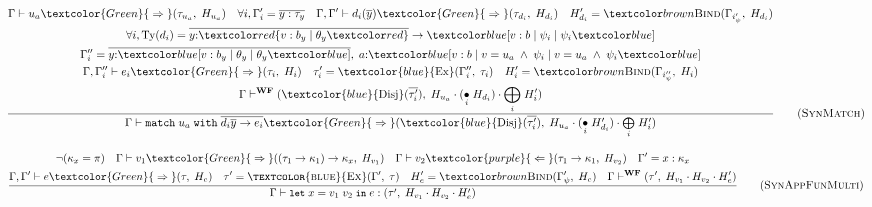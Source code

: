\begin{figure}[H]
    \begin{equation}
        \frac{
            \begin{gathered}
                \Gamma \vdash u_a \textcolor{Green}{\;\Rightarrow\;} (\tau_{u_a}, \;H_{u_a}) \quad \forall i, \Gamma'_i = \overline{y: \tau_y} \quad \Gamma, \Gamma' \vdash d_i(\overline{y}) \textcolor{Green}{\;\Rightarrow\;} (\tau_{d_i}, \;H_{d_i}) \quad H_{d_i}' = \bind(\Gamma_{i'_{\psi}}, \;H_{d_i}) \\
                \forall i, \text{Ty}(d_i) = \overline{y{:}\overa{v: b_y \;|\; \theta_y}} \rightarrow \under{v: b \;|\; \psi_i \;|\; \psi_i} \\
                \Gamma''_{i} = \overline{y{:}\under{v: b_y \;|\; \theta_y \;|\; \theta_y}}, \;a{:}\under{v: b \;|\; v = u_a \;\land\; \psi_i \;|\; v = u_a \;\land\; \psi_i} \\
                \Gamma, \Gamma''_{i} \vdash e_i \textcolor{Green}{\;\Rightarrow\;} (\tau_i, \; H_i) \quad \tau'_i = \textcolor{blue}{\text{Ex}}(\Gamma''_{i}, \;\tau_i) \quad H_i' = \bind(\Gamma_{i''_{\psi}}, \;H_i) \\
                \Gamma \vdash^{\textbf{WF}} (\textcolor{blue}{\text{Disj}}(\overline{\tau'_i}), \;H_{u_a} \cdot (\underset{i}{\bullet} \;H_{d_i}) \cdot \underset{i}{\bigoplus} \;H_i')
            \end{gathered}
        }{
            \Gamma \vdash \texttt{match} \;u_a\; \texttt{with}  \; \overline{d_i\overline{y} \rightarrow e_i} \textcolor{Green}{\;\Rightarrow\;} (\textcolor{blue}{\text{Disj}}(\overline{\tau'_i}), \; H_{u_a} \cdot (\underset{i}{\bullet} \; H_{d_i}') \cdot \underset{i}{\bigoplus} \; H_i')
        }
        \tag{\textsc{SynMatch}}
        \label{eq:synmatch}
    \end{equation}

    \begin{equation}
        \frac{
            \begin{gathered}
                \neg(\kappa_x = \pi) \quad \Gamma \vdash v_1 \textcolor{Green}{\;\Rightarrow\;} ((\tau_1 \rightarrow \kappa_1) \rightarrow \kappa_x, \; H_{v_1}) \quad \Gamma \vdash v_2 \textcolor{purple}{\;\Leftarrow\;} (\tau_1 \rightarrow \kappa_1, \; H_{v_2}) \quad \Gamma' = x : \kappa_x \\
                \Gamma, \Gamma' \vdash e \textcolor{Green}{\;\Rightarrow\;} (\tau, \; H_e) \quad \tau' = \textsc{\textcolor{blue}{Ex}}(\Gamma', \;\tau) \quad H_e' = \bind(\Gamma'_{\psi}, \;H_e) \quad \Gamma \vdash^{\textbf{WF}} (\tau', \; H_{v_1} \cdot H_{v_2} \cdot H_e')
            \end{gathered}
        }{
            \Gamma \vdash \texttt{\small{let}}\;x = v_1\;v_2\;\texttt{\small{in}}\;e : (\tau', \; H_{v_1} \cdot H_{v_2} \cdot H_e')
        }
        \tag{\textsc{SynAppFunMulti}}
        \label{eq:synappfunmulti}
    \end{equation}
    

\end{figure}
